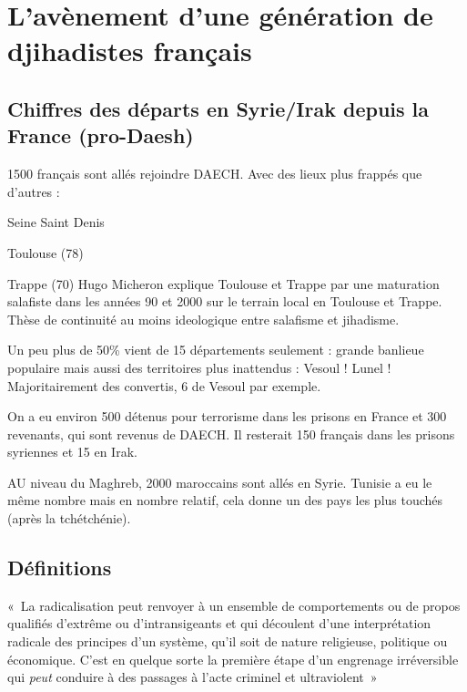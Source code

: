 \section{ L’avènement d’une génération de djihadistes français}

 
 \subsection{Chiffres des départs en Syrie/Irak depuis la France (pro-Daesh)}
1500 français sont allés rejoindre DAECH. Avec des lieux plus frappés que d'autres : 
\bi
\item Seine Saint Denis
\item Toulouse (78)
\item Trappe (70) 
\ei 
Hugo Micheron  explique Toulouse et Trappe par une maturation salafiste dans les années 90 et 2000 sur le terrain local en Toulouse et Trappe. Thèse de continuité au moins ideologique entre salafisme et jihadisme.

Un peu plus de 50\% vient de 15 départements seulement : grande banlieue populaire mais aussi des territoires plus inattendus : Vesoul ! Lunel ! Majoritairement des convertis, 6 de Vesoul par exemple. 

On a eu environ 500 détenus pour terrorisme dans les prisons en France et 300 revenants, qui sont revenus de DAECH. Il resterait 150 français dans les prisons syriennes et 15 en Irak. 

AU niveau du Maghreb, 2000 maroccains sont allés en Syrie. Tunisie a eu le même nombre mais en nombre relatif, cela donne un des pays les plus touchés (après la tchétchénie).
 
\subsection{Définitions} 

\begin{Def}[Radicalisation]
« La radicalisation peut renvoyer à un ensemble de comportements ou de propos qualifiés d’extrême ou d’intransigeants et qui découlent d’une interprétation radicale des principes d’un système, qu’il soit de nature religieuse, politique ou économique. C’est en quelque sorte la première étape d’un engrenage irréversible qui \textit{peut} conduire à des passages à l’acte criminel et ultraviolent » 
\end{Def}

